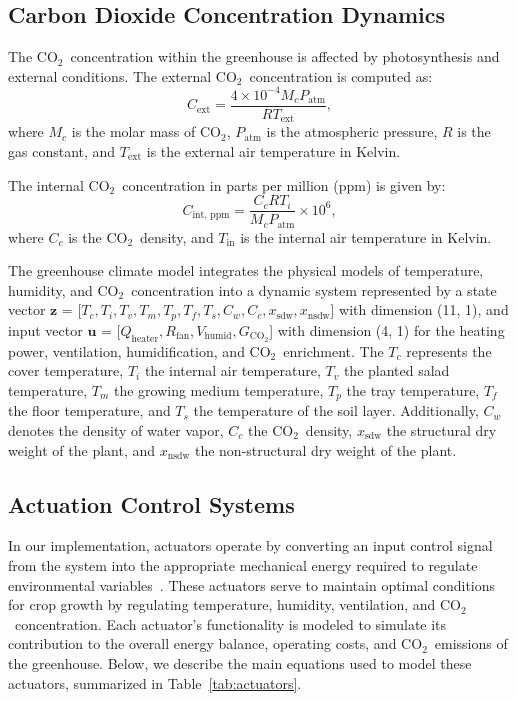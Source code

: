 \documentclass[conference]{IEEEtran}
\newcommand{\coo}{\ensuremath{\mathrm{CO_2}}}
\begin{document}
\subsection{Carbon Dioxide Concentration Dynamics}

The \coo\ concentration within the greenhouse is affected by photosynthesis and external conditions. The external \coo\ concentration is computed as:
\begin{equation}
    C_{\text{ext}} = \frac{4 \times 10^{-4}  M_c  P_{\text{atm}}}{R  T_{\text{ext}}},
\end{equation}
where \(M_c\) is the molar mass of \coo, \(P_{\text{atm}}\) is the atmospheric pressure, \(R\) is the gas constant, and \(T_{\text{ext}}\) is the external air temperature in Kelvin.

The internal \coo\ concentration in parts per million (ppm) is given by:
\begin{equation}
    C_{\text{int, ppm}} = \frac{C_c  R  T_i}{M_c  P_{\text{atm}}} \times 10^6,
\end{equation}
where \(C_c\) is the \coo\ density, and \(T_{\text{in}}\) is the internal air temperature in Kelvin.

The greenhouse climate model integrates the physical models of temperature, humidity, and \coo\ concentration into a dynamic system represented by a state vector \(\mathbf{z}\) = [\(T_c, T_i, T_v, T_m, T_p, T_f, T_s, C_w, C_c, x_{\text{sdw}}, x_{\text{nsdw}}\)] with dimension (11, 1), and input vector \(\mathbf{u}\) = [\(Q_{\text{heater}}, R_{\text{fan}}, V_{\text{humid}}, G_{\coo} \)] with dimension (4, 1) for the heating power, ventilation, humidification, and \coo\ enrichment. The \(T_c\) represents the cover temperature, \(T_i\) the internal air temperature, \(T_v\) the planted salad temperature, \(T_m\) the growing medium temperature, \(T_p\) the tray temperature, \(T_f\) the floor temperature, and \(T_s\) the temperature of the soil layer. Additionally, \(C_w\) denotes the density of water vapor, \(C_c\) the \coo\ density, \(x_{\text{sdw}}\) the structural dry weight of the plant, and \(x_{\text{nsdw}}\) the non-structural dry weight of the plant.

\subsection{Actuation Control Systems}
In our implementation, actuators operate by converting an input control signal from the system into the appropriate mechanical energy required to regulate environmental variables~\cite{Butterfield2018}. These actuators serve to maintain optimal conditions for crop growth by regulating temperature, humidity, ventilation, and \coo\ concentration. Each actuator's functionality is modeled to simulate its contribution to the overall energy balance, operating costs, and \coo\ emissions of the greenhouse. Below, we describe the main equations used to model these actuators, summarized in Table~\ref{tab:actuators}.
\end{document}

